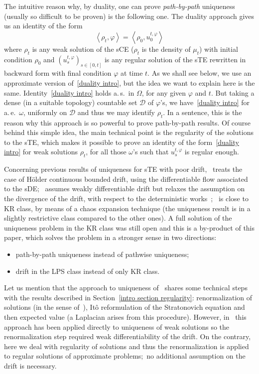 \documentclass[a4paper,10pt]{article}
\begin{document}
The intuitive reason why, by duality, one can prove \textit{path-by-path}
uniqueness (usually so difficult to be proven) is the following one. The
duality approach gives us an identity of the form 
\begin{equation}
\left\langle \rho_{t},\varphi\right\rangle =\left\langle \rho_{0} 
,u_{0}^{t,\varphi}\right\rangle \label{duality intro} 
\end{equation}
where $\rho_{t}$ is any weak solution of the sCE ($\rho_{t}$ is the density of
$\mu_{t}$) with initial condition $\rho_{0}$ and $\left(  u_{s}^{t,\varphi
}\right)  _{s\in\left[  0,t\right]  }$ is any regular solution of the sTE
rewritten in backward form with final condition $\varphi$ at time $t$. As we
shall see below, we use an approximate version of~\eqref{duality intro}, but
the idea we want to explain here is the same. Identity~\eqref{duality intro}
holds a.\,s.\ in $\Omega$, for any given $\varphi$ and $t$. But taking a dense
(in a suitable topology) countable set $\mathcal{D}$ of $\varphi$'s, we 
have~\eqref{duality intro} for a.\,e.\ $\omega$, uniformly on $\mathcal{D}$ and thus
we may identify $\rho_{t}$. In a sentence, this is the reason why this
approach is so powerful to prove path-by-path results. Of course behind this
simple idea, the main technical point is the regularity of the solutions to the sTE, which
makes it possible to prove an identity of the form~\eqref{duality intro} for weak
solutions $\rho_{t}$, for all those $\omega$'s such that $u_{s}^{t,\varphi}$
is regular enough.

Concerning previous results of uniqueness for sTE
with poor drift,~\cite{FLAGUBPRI10} treats the case of H\"{o}lder continuous
bounded drift, using the differentiable flow associated to the sDE;~\cite{AtFl} assumes weakly differentiable drift but relaxes the assumption on the
divergence of the drift, with respect to the deterministic works~\cite{DIPELI89,AMBROSIO04};~\cite{Ma} is close to KR class, by means of a chaos expansion
technique (the uniqueness result is in a slightly restrictive class compared to
the other ones). A full solution of the uniqueness problem in the KR class
was still open and this is a by-product of this paper, which solves the
problem in a stronger sense in two directions:
\begin{itemize}
\item[i)] path-by-path uniqueness instead of pathwise uniqueness;
\item[ii)] drift in the LPS class instead of only KR class.
\end{itemize}
Let us mention that the approach to uniqueness of~\cite{AtFl} shares some
technical steps with the results described in Section~\ref{intro section
regularity}: renormalization of solutions (in the sense of~\cite{DIPELI89}), 
It\^{o} reformulation of the Stratonovich equation and then expected value (a
Laplacian arises from this procedure). However, in~\cite{AtFl} this approach
has been applied directly to uniqueness of weak solutions so the
renormalization step required weak differentiability of the drift. On the
contrary, here we deal with regularity of solutions and thus the
renormalization is applied to regular solutions of approximate problems;\ no
additional assumption on the drift is necessary.
\end{document}

